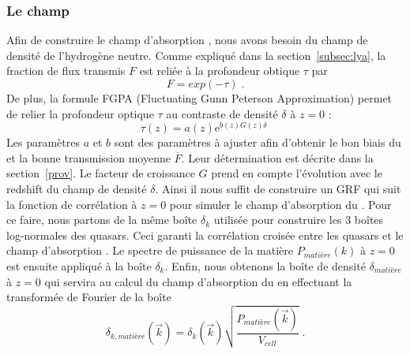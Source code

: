 \documentclass[11pt, twoside, a4paper, openright]{report}
\begin{document}
\subsubsection{Le champ \lya{}}
Afin de construire le champ d'absorption \lya{}, nous avons besoin du champ de densité de l'hydrogène neutre. Comme expliqué dans la section~\ref{subsec:lya}, la fraction de flux transmis $F$ est reliée à la profondeur obtique $\tau$ par
\begin{equation}
  F = exp(- \tau) \; .
\end{equation}
De plus, la formule FGPA (Fluctuating Gunn Peterson Approximation) permet de relier la profondeur optique $\tau$ au contraste de densité $\delta$ à $z = 0$ :
\begin{equation}
  \label{eq:fgpa1}
  \tau(z) = a(z) \mathrm{e}^{b(z) G(z) \delta} \;
\end{equation}
Les paramètres $a$ et $b$ sont des paramètres à ajuster afin d'obtenir le bon biais du \lya{} et la bonne transmission moyenne $\overline F$. Leur détermination est décrite dans la section~\ref{prov}. Le facteur de croissance $G$ prend en compte l'évolution avec le redshift du champ de densité $\delta$. Ainsi il nous suffit de construire un GRF qui suit la fonction de corrélation à $z=0$ pour simuler le champ d'absorption du \lya{}. Pour ce faire, nous partons de la même boîte $\delta_k$ utilisée pour construire les 3 boîtes log-normales des quasars. Ceci garanti la corrélation croisée entre les quasars et le champ d'absorption \lya{}. Le spectre de puissance de la matière $P_{matière}(k)$ à $z=0$ est ensuite appliqué à la boîte $\delta_k$. Enfin, nous obtenons la boîte de densité $\delta_{matière}$ à $z = 0$ qui servira au calcul du champ d'absorption du \lya{} en effectuant la transformée de Fourier de la boîte
\begin{equation}
  \delta_{k, matière}(\vec k)  = \delta_k(\vec k) \sqrt{\frac{P_{matière}(\vec k)}{V_{cell}}} \; .
\end{equation}
\end{document}
